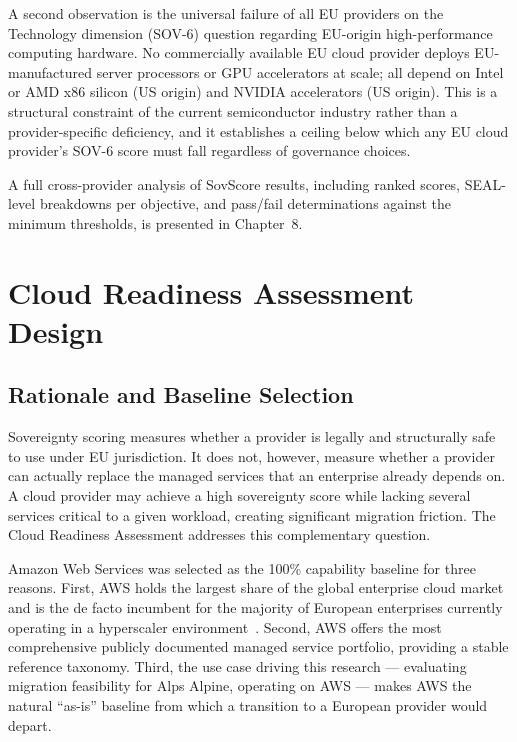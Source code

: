 A second observation is the universal failure of all EU providers on the Technology dimension (SOV-6) question regarding EU-origin high-performance computing hardware. No commercially available EU cloud provider deploys EU-manufactured server processors or GPU accelerators at scale; all depend on Intel or AMD x86 silicon (US origin) and NVIDIA accelerators (US origin). This is a structural constraint of the current semiconductor industry rather than a provider-specific deficiency, and it establishes a ceiling below which any EU cloud provider's SOV-6 score must fall regardless of governance choices.

A full cross-provider analysis of SovScore results, including ranked scores, SEAL-level breakdowns per objective, and pass/fail determinations against the minimum thresholds, is presented in Chapter~8.

\section{Cloud Readiness Assessment Design}
\label{sec:readiness_methodology}

\subsection{Rationale and Baseline Selection}
\label{subsec:readiness_rationale}

Sovereignty scoring measures whether a provider is legally and structurally safe to use under EU jurisdiction. It does not, however, measure whether a provider can actually replace the managed services that an enterprise already depends on. A cloud provider may achieve a high sovereignty score while lacking several services critical to a given workload, creating significant migration friction. The Cloud Readiness Assessment addresses this complementary question.

Amazon Web Services was selected as the 100\% capability baseline for three reasons. First, AWS holds the largest share of the global enterprise cloud market and is the de facto incumbent for the majority of European enterprises currently operating in a hyperscaler environment~\cite{armbrust2010view}. Second, AWS offers the most comprehensive publicly documented managed service portfolio, providing a stable reference taxonomy. Third, the use case driving this research — evaluating migration feasibility for Alps Alpine, operating on AWS — makes AWS the natural ``as-is'' baseline from which a transition to a European provider would depart.

